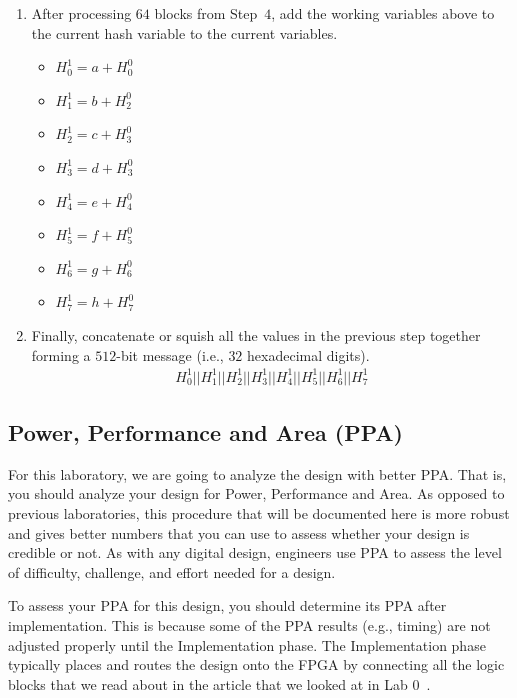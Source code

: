 \documentclass{article}
\begin{document}
\begin{enumerate}
  \item After processing $64$ blocks from Step~$4$, add the working
    variables above to the current hash variable    
    to the current variables.
    \begin{itemize}
    \item $H_0^1 = a + H_0^0$
    \item $H_1^1 = b + H_2^0$
    \item $H_2^1 = c + H_3^0$
    \item $H_3^1 = d + H_3^0$
    \item $H_4^1 = e + H_4^0$
    \item $H_5^1 = f + H_5^0$
    \item $H_6^1 = g + H_6^0$
    \item $H_7^1 = h + H_7^0$
    \end{itemize}

  \item Finally, concatenate or squish all the values in the
    previous step together forming a $512$-bit message (i.e., $32$
    hexadecimal digits).
    \begin{eqnarray*}
      H_0^1 || H_1^1 || H_2^1 || H_3^1 || H_4^1 || H_5^1 || H_6^1 || H_7^1
    \end{eqnarray*}
    
\end{enumerate}


\subsection{Power, Performance and Area (PPA)}

For this laboratory, we are going to analyze the design with better
PPA.  That is, you should analyze your design for Power, Performance
and Area.  As opposed to previous laboratories, this procedure that
will be documented here is more robust and gives better numbers that
you can use to assess whether your design is credible or not.  As with
any digital design, engineers use PPA to assess the level of
difficulty, challenge, and effort needed for a design.

To assess your PPA for this design, you should determine its PPA after
implementation.  This is because some of the PPA results (e.g.,
timing) are not adjusted properly until the Implementation phase.  The
Implementation phase typically places and routes the design onto the
FPGA by connecting all the logic blocks that we read about in the
article that we looked at in Lab 0~\cite{7086413}.
\end{document}
